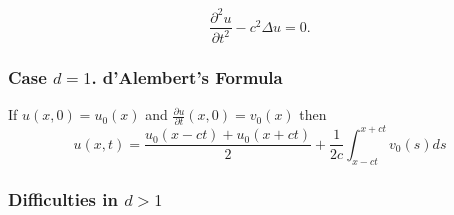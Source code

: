 \begin{equation}
    \tag{W}
    \label{eq:wave}
    \frac{\partial^2 u}{\partial t^2} - c^2\Delta u = 0.
\end{equation}

\subsubsection{Case $d=1$. d'Alembert's Formula}

If $u(x,0) = u_0(x)$ and $\frac{\partial u}{\partial t} (x,0) = v_0(x)$ then
\begin{equation*}
    \tag{W-d'A}
    \label{eq:wave 1d D'Alambert}
    u(x,t) = \frac{u_0(x-ct) + u_0(x+ct)}{2} + \frac 1 {2c} \int_{x-ct}^{x+ct} v_0(s) ds
\end{equation*}

\subsubsection{Difficulties in $d>1$}
